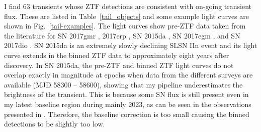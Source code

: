 \documentclass[a4paper,oneside,12pt, class=Latex/Classes/PhDthesisPSnPDF, crop=false]{standalone}
\begin{document}
I find 63 transients whose ZTF detections are consistent with on-going transient flux. These are listed in Table~\ref{tail_objects} and some example light curves are shown in Fig.~\ref{tail-examples}. The light curves show pre-ZTF data taken from the literature for  SN 2017gmr \cite[][]{2017gmr},  2017erp \cite[][]{2017erp}, SN 2015da \cite[][]{2015da_2020}, SN 2017egm \cite[][]{2017egm}, and SN 2017dio \cite[][]{2017dio}. SN 2015da is an extremely slowly declining SLSN IIn event \citep{2015da_2020, 2015da_2024} and its light curve extends in the binned ZTF data to approximately eight years after discovery. In SN 2015da, the pre-ZTF and binned ZTF light curves do not overlap exactly in magnitude at epochs when data from the different surveys are available (MJD 58300 -- 58600), showing that my pipeline underestimates the brightness of the transient. This is because some SN flux is still present even in my latest baseline region during mainly 2023, as can be seen in the observations presented in \citet{2015da_2024}. Therefore, the baseline correction is too small causing the binned detections to be slightly too low.
\end{document}

